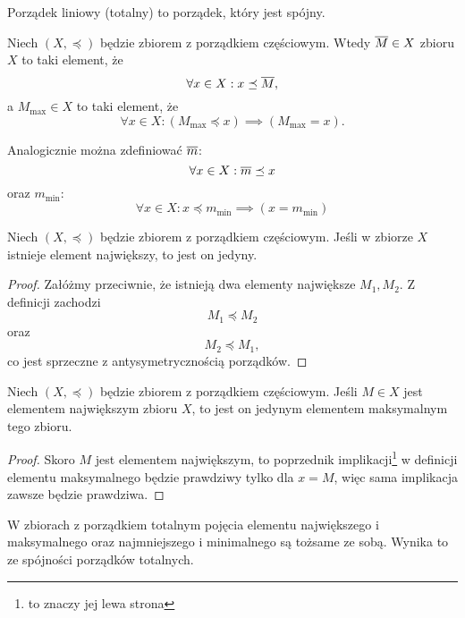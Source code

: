 \documentclass[11pt]{scrartcl}
\begin{document}
    \begin{definition}
        Porządek liniowy (totalny) to porządek, który jest spójny.
    \end{definition}

    Niech $(X, \preceq)$ będzie zbiorem z porządkiem częściowym. Wtedy  $\overline{M} \in X$ zbioru $X$ to taki element, że
    $$ \forall x \in X : x \preceq \overline{M}, $$
    a  $M_{\max} \in X$ to taki element, że
    $$ \forall x \in X : (M_{\max} \preceq x) \implies (M_{\max} = x). $$

    \begin{remark}
        Analogicznie można zdefiniować  $\overline{m}$:
        $$ \forall x \in X : \overline{m} \preceq x $$
        oraz  $m_{\min}$:
        $$ \forall x \in X : x \preceq m_{\min} \implies (x = m_{\min}) $$
    \end{remark}

    \begin{theorem}
        \label{t:uniq_greatest}
        Niech $(X, \preceq)$ będzie zbiorem z porządkiem częściowym. Jeśli w zbiorze $X$ istnieje element największy, to jest on jedyny.
    \end{theorem}
    \begin{proof}
        Załóżmy przeciwnie, że istnieją dwa elementy największe $M_1, M_2$. Z definicji zachodzi
        $$ M_1 \preceq M_2 $$
        oraz
        $$ M_2 \preceq M_1, $$
        co jest sprzeczne z antysymetrycznością porządków.
    \end{proof}

    \begin{theorem}
        Niech $(X, \preceq)$ będzie zbiorem z porządkiem częściowym. Jeśli $M \in X$ jest elementem największym zbioru $X$, to jest on jedynym elementem maksymalnym tego zbioru.
    \end{theorem}
    \begin{proof}
        Skoro $M$ jest elementem największym, to poprzednik implikacji\footnote{to znaczy jej lewa strona} w definicji elementu maksymalnego będzie prawdziwy tylko dla $x = M$, więc sama implikacja zawsze będzie prawdziwa.
    \end{proof}

    \begin{fact}
        \label{f:greatest=maximal}
        W zbiorach z porządkiem totalnym pojęcia elementu największego i maksymalnego oraz najmniejszego i minimalnego są tożsame ze sobą. Wynika to ze spójności porządków totalnych.
    \end{fact}
\end{document}
